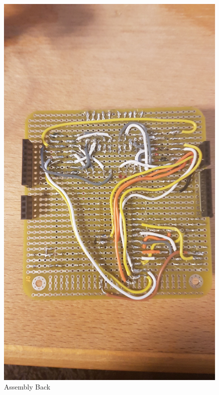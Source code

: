 \begin{figure}[h]%
\begin{minipage}{.5\textwidth}
	\includegraphics[width =1\textwidth]{"assets/assembly_back"}
	\centering
	\caption{Assembly Back}
	\label{fig:Assembly_Back}
\end{minipage}
\begin{minipage}{.5\textwidth}

\end{minipage}
\end{figure}
